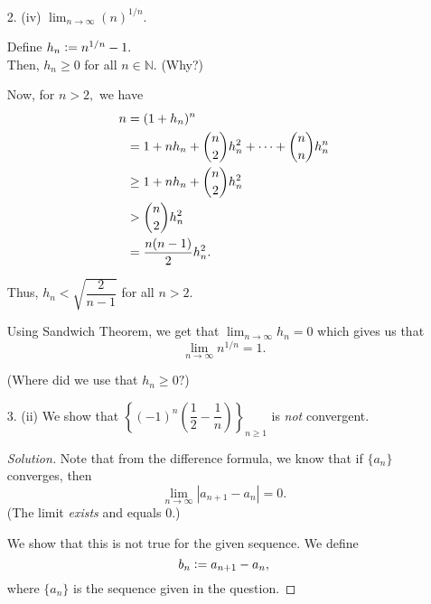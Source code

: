 \documentclass[12pt]{article}
\theoremstyle{definition}
\newenvironment{soln}{\begin{proof}[Solution]}{\end{proof}}
\begin{document}
\begin{itemize}[leftmargin=*]
	\item [2. (iv)]$\displaystyle\lim_{n\to \infty}(n)^{1/n}.$

	Define $h_n \vcentcolon= n^{1/n} - 1.$\\
	Then, $h_n \ge 0$ for all $n \in \mathbb{N}.$ \hfill (Why?)

	Now, for $n > 2,$ we have 
	\begin{align*} 
		n &= (1 + h_n)^n \\
		&= 1 + nh_n + \dbinom{n}{2}h_n^2 + \cdots + \dbinom{n}{n}h_n^n\\
		&\ge 1 + nh_n + \dbinom{n}{2}h_n^2 \\
		&> \dbinom{n}{2}h_n^2 \\
		&= \dfrac{n(n-1)}{2}h_n^2.
	\end{align*}

	Thus, $h_n < \sqrt{\dfrac{2}{n-1}}$ for all $n > 2.$

	Using Sandwich Theorem, we get that $\displaystyle\lim_{n\to \infty}h_n = 0$ which gives us that 
	\begin{equation*} 
		\displaystyle\lim_{n\to \infty}n^{1/n} = 1.
	\end{equation*}

	(Where did we use that $h_n \ge 0?$)
	\newpage
	\item[3. (ii)] We show that $\left\{(-1)^n\left(\dfrac{1}{2} - \dfrac{1}{n}\right)\right\}_{n \ge 1}$ is \emph{not} convergent.

	\begin{soln}
	
	Note that from the difference formula, we know that if $\{a_n\}$ converges, then
	\begin{equation*} 
		\lim_{n\to \infty}\left|a_{n+1} - a_n\right| = 0.
	\end{equation*}
	(The limit \emph{exists} and equals $0.$)

	We show that this is not true for the given sequence. We define 
	\begin{equation*} 
		b_{n} \vcentcolon= a_{n + 1} - a_n,
	\end{equation*}
	where $\{a_n\}$ is the sequence given in the question.	


\end{soln}
\end{itemize}
\end{document}
